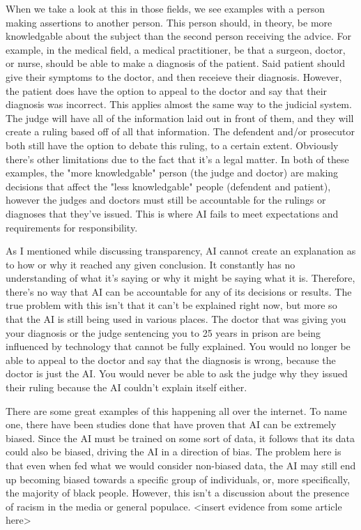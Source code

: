 \documentclass[12pt]{article}
\begin{document}
    When we take a look at this in those fields, we see examples with a person making assertions to
    another person. This person should, in theory, be more knowledgable about the subject than the 
    second person receiving the advice. For example, in the medical field, a medical practitioner,
    be that a surgeon, doctor, or nurse, should be able to make a diagnosis of the patient. Said
    patient should give their symptoms to the doctor, and then receieve their diagnosis. However,
    the patient does have the option to appeal to the doctor and say that their diagnosis was
    incorrect. This applies almost the same way to the judicial system. The judge will have all
    of the information laid out in front of them, and they will create a ruling based off of all
    that information. The defendent and/or prosecutor both still have the option to debate this
    ruling, to a certain extent. Obviously there's other limitations due to the fact that it's a
    legal matter. In both of these examples, the "more knowledgable" person (the judge and doctor)
    are making decisions that affect the "less knowledgable" people (defendent and patient),
    however the judges and doctors must still be accountable for the rulings or diagnoses that
    they've issued. This is where AI fails to meet expectations and requirements for responsibility.

    As I mentioned while discussing transparency, AI cannot create an explanation as to how or why
    it reached any given conclusion. It constantly has no understanding of what it's saying or
    why it might be saying what it is. Therefore, there's no way that AI can be accountable for 
    any of its decisions or results. The true problem with this isn't that it can't be explained
    right now, but more so that the AI is still being used in various places. The doctor that was
    giving you your diagnosis or the judge sentencing you to 25 years in prison are being influenced
    by technology that cannot be fully explained. You would no longer be able to appeal to the doctor
    and say that the diagnosis is wrong, because the doctor is just the AI. You would never be able
    to ask the judge why they issued their ruling because the AI couldn't explain itself either.

    There are some great examples of this happening all over the internet. To name one, there have
    been studies done that have proven that AI can be extremely biased. Since the AI must be trained
    on some sort of data, it follows that its data could also be biased, driving the AI in a direction
    of bias. The problem here is that even when fed what we would consider non-biased data, the AI
    may still end up becoming biased towards a specific group of individuals, or, more specifically,
    the majority of black people. However, this isn't a discussion about the presence of racism in 
    the media or general populace. <insert evidence from some article here>
\end{document}

